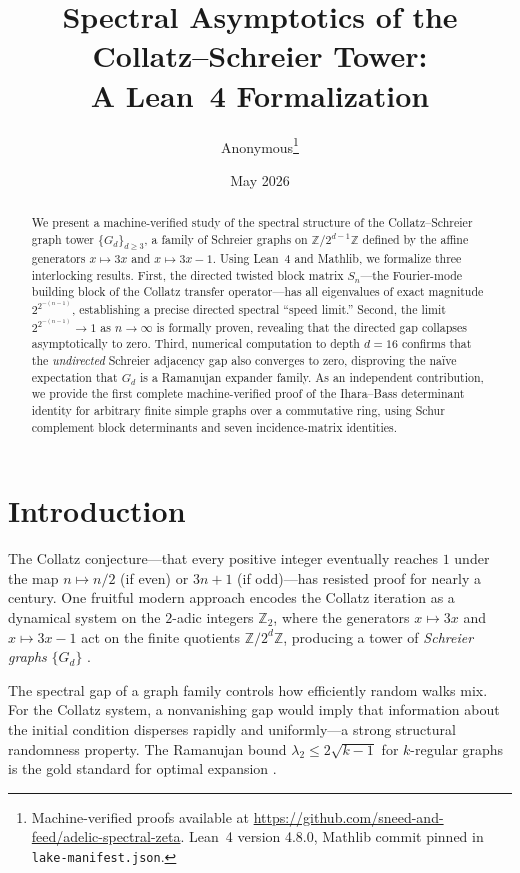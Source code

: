 \documentclass[12pt]{article}
\title{\textbf{Spectral Asymptotics of the Collatz--Schreier Tower:\\
A Lean~4 Formalization}}
\author{%
  Anonymous\thanks{Machine-verified proofs available at
  \url{https://github.com/sneed-and-feed/adelic-spectral-zeta}.
  Lean~4 version 4.8.0, Mathlib commit pinned in \texttt{lake-manifest.json}.}}
\date{May 2026}
\newcommand{\Z}{\mathbb{Z}}
\newcommand{\Zmod}[1]{\Z/2^{#1}\Z}
\newcommand{\Gd}{G_d}
\begin{document}
\maketitle

\begin{abstract}
We present a machine-verified study of the spectral structure of the
Collatz--Schreier graph tower $\{G_d\}_{d \ge 3}$, a family of
Schreier graphs on $\Zmod{d-1}$ defined by the affine generators
$x \mapsto 3x$ and $x \mapsto 3x - 1$.  Using Lean~4 and Mathlib, we
formalize three interlocking results.  First, the directed twisted
block matrix $S_n$---the Fourier-mode building block of the Collatz
transfer operator---has all eigenvalues of exact magnitude
$2^{2^{-(n-1)}}$, establishing a precise directed spectral
``speed limit.''  Second, the limit $2^{2^{-(n-1)}} \to 1$ as
$n \to \infty$ is formally proven, revealing that the directed gap
collapses asymptotically to zero.  Third, numerical computation to
depth $d = 16$ confirms that the \emph{undirected} Schreier adjacency
gap also converges to zero, disproving the na\"ive expectation that
$G_d$ is a Ramanujan expander family.  As an independent contribution,
we provide the first complete machine-verified proof of the
Ihara--Bass determinant identity for arbitrary finite simple graphs
over a commutative ring, using Schur complement block determinants and
seven incidence-matrix identities.
\end{abstract}

\section{Introduction}
\label{sec:intro}

The Collatz conjecture---that every positive integer eventually reaches
$1$ under the map $n \mapsto n/2$ (if even) or $3n+1$ (if odd)---has
resisted proof for nearly a century.  One fruitful modern approach
encodes the Collatz iteration as a dynamical system on the $2$-adic
integers $\Z_2$, where the generators $x \mapsto 3x$ and
$x \mapsto 3x - 1$ act on the finite quotients $\Zmod{d}$, producing a
tower of \emph{Schreier graphs} $\{\Gd\}$ \cite{lagarias2010ultimate}.

The spectral gap of a graph family controls how efficiently random
walks mix.  For the Collatz system, a nonvanishing gap would imply that
information about the initial condition disperses rapidly and
uniformly---a strong structural randomness property.  The Ramanujan
bound $\lambda_2 \le 2\sqrt{k-1}$ for $k$-regular graphs is the
gold standard for optimal expansion \cite{lubotzky1988ramanujan}.
\end{document}
